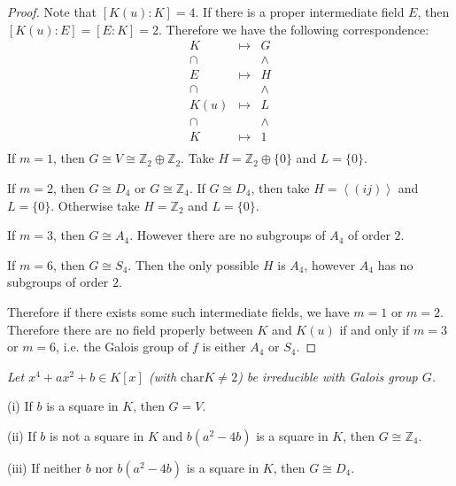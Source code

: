 \begin{proof}
Note that $[K(u):K]=4$. If there is a proper intermediate field $E$, then $[K(u):E]=[E:K]=2$. Therefore we have the following correspondence: 
$$
\begin{matrix}
	K&		\mapsto&		G\\
	\cap&		&		\land\\
	E&		\mapsto&		H\\
	\cap&		&		\land\\
	K\left( u \right)&		\mapsto&		L\\
	\cap&		&		\land\\
	K&		\mapsto&		1\\
\end{matrix}
$$
If $m=1$, then $G\cong V\cong\mathbb{Z}_2\oplus\mathbb{Z}_2$. Take $H=\mathbb{Z}_2\oplus\{0\}$ and $L=\{0\}$.\par
If $m=2$, then $G\cong D_4$ or $G\cong\mathbb{Z}_4$. If $G\cong D_4$, then take $H=\left<(ij)\right>$ and $L=\{0\}$. Otherwise take $H=\mathbb{Z}_2$ and $L=\{0\}$.\par
If $m=3$, then $G\cong A_4$. However there are no subgroups of $A_4$ of order $2$.\par
If $m=6$, then $G\cong S_4$. Then the only possible $H$ is $A_4$, however $A_4$ has no subgroups of order $2$.\par
Therefore if there exists some such intermediate fields, we have $m=1$ or $m=2$. Therefore there are no field properly between $K$ and $K(u)$ if and only if $m=3$ or $m=6$, i.e. the Galois group of $f$ is either $A_4$ or $S_4$.
\end{proof}
\begin{problem}\em
Let $x^4+ax^2+b\in K[x]$ (with $\mathrm{char }K\neq 2$) be irreducible with Galois group $G$.\par
(i) If $b$ is a square in $K$, then $G=V$.\par
(ii) If $b$ is not a square in $K$ and $b(a^2-4b)$ is a square in $K$, then $G\cong \mathbb{Z}_4$.\par
(iii) If neither $b$ nor $b(a^2-4b)$ is a square in $K$, then $G\cong D_4$.
\end{problem}
